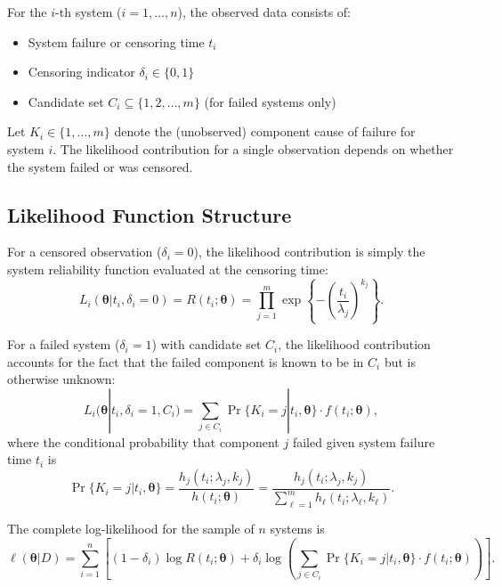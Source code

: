 \documentclass[11pt]{article}
\renewcommand{\v}[1]{\boldsymbol{#1}}
\begin{document}
For the $i$-th system ($i = 1, \ldots, n$), the observed data consists of:
\begin{itemize}
\item System failure or censoring time $t_i$
\item Censoring indicator $\delta_i \in \{0, 1\}$
\item Candidate set $C_i \subseteq \{1, 2, \ldots, m\}$ (for failed systems only)
\end{itemize}

Let $K_i \in \{1, \ldots, m\}$ denote the (unobserved) component cause of failure for system $i$. The likelihood contribution for a single observation depends on whether the system failed or was censored.

\subsection{Likelihood Function Structure}

For a censored observation ($\delta_i = 0$), the likelihood contribution is simply the system reliability function evaluated at the censoring time:
\begin{equation}
L_i(\v\theta | t_i, \delta_i = 0) = R(t_i; \v\theta) = \prod_{j=1}^{m} \exp\left\{-\left(\frac{t_i}{\lambda_j}\right)^{k_j}\right\}.
\end{equation}

For a failed system ($\delta_i = 1$) with candidate set $C_i$, the likelihood contribution accounts for the fact that the failed component is known to be in $C_i$ but is otherwise unknown:
\begin{equation}
L_i(\v\theta | t_i, \delta_i = 1, C_i) = \sum_{j \in C_i} \Pr\{K_i = j | t_i, \v\theta\} \cdot f(t_i; \v\theta),
\end{equation}
where the conditional probability that component $j$ failed given system failure time $t_i$ is
\begin{equation}
\Pr\{K_i = j | t_i, \v\theta\} = \frac{h_j(t_i; \lambda_j, k_j)}{h(t_i; \v\theta)} = \frac{h_j(t_i; \lambda_j, k_j)}{\sum_{\ell=1}^{m} h_\ell(t_i; \lambda_\ell, k_\ell)}.
\end{equation}

The complete log-likelihood for the sample of $n$ systems is
\begin{equation}
\ell(\v\theta | D) = \sum_{i=1}^{n} \left[ (1-\delta_i) \log R(t_i; \v\theta) + \delta_i \log \left( \sum_{j \in C_i} \Pr\{K_i = j | t_i, \v\theta\} \cdot f(t_i; \v\theta) \right) \right].
\end{equation}
\end{document}
